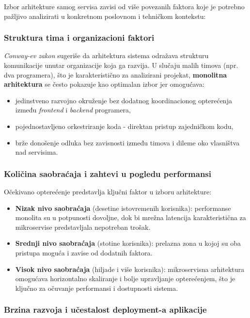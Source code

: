 \documentclass[12pt]{article}
\begin{document}
    Izbor arhitekture samog servisa zavisi od više povezanih faktora koje je potrebno pažljivo 
    analizirati u konkretnom poslovnom i tehničkom kontekstu:

    \subsubsection*{Struktura tima i organizacioni faktori}

    \textit{Conway-ev zakon} sugeriše da arhitektura sistema odražava strukturu komunikacije unutar organizacije koja ga razvija. U slučaju malih timova (npr. dva programera), što je karakteristično za analizirani projekat, \textbf{monolitna arhitektura} se često pokazuje kao optimalan izbor jer omogućava:
    \begin{itemize}
        \item jedinstveno razvojno okruženje bez dodatnog koordinacionog opterećenja između \textit{frontend} i \textit{backend} programera,
        \item pojednostavljeno orkestriranje koda - direktan pristup zajedničkom kodu,
        \item brže donošenje odluka bez zavisnosti između timova i dileme oko vlasništva nad servisima.
    \end{itemize}

    \subsubsection*{Količina saobraćaja i zahtevi u pogledu performansi}

    Očekivano opterećenje predstavlja ključni faktor u izboru arhitekture:
    \begin{itemize}
        \item \textbf{Nizak nivo saobraćaja} (desetine istovremenih korisnika): performanse monolita su u potpunosti dovoljne, dok bi mrežna latencija karakteristična za mikroservise predstavljala nepotreban trošak.
        \item \textbf{Srednji nivo saobraćaja} (stotine korisnika): prelazna zona u kojoj su oba pristupa moguća i zavise od dodatnih faktora.
        \item \textbf{Visok nivo saobraćaja} (hiljade i više korisnika): mikroservisna arhitektura omogućava horizontalno skaliranje i bolje upravljanje opterećenjem, što je ključno za očuvanje performansi i dostupnosti sistema.
    \end{itemize}

    \subsubsection*{Brzina razvoja i učestalost deployment-a aplikacije}
\end{document}
